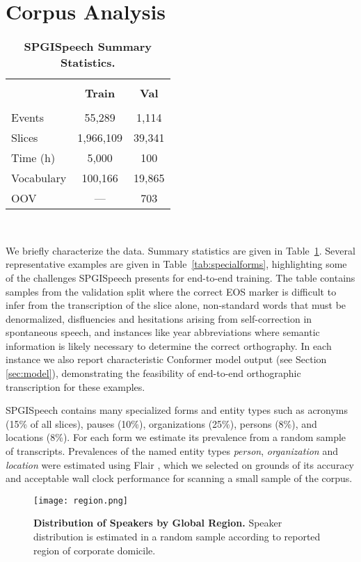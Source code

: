 \documentclass{article}
\newcommand{\traincalls}{55,289}
\newcommand{\valcalls}{1,114}
\newcommand{\trainslices}{1,966,109}
\newcommand{\valslices}{39,341}
\newcommand{\trainvocab}{100,166}
\newcommand{\valvocab}{19,865}
\newcommand\tabref{Table~\ref}
\newcommand{\corpus}{SPGISpeech}
\begin{document}
\section{Corpus Analysis}\label{sec:analysis}

\begin{table}\centering
\begin{tabular}{l|cc}
\hline
  \\ [-2.2ex]
  & \textbf{Train} & \textbf{Val}  \\
  \hline
  \hline
  \\ [-2.0ex]
  Events & \traincalls & \valcalls  \\
  Slices & \trainslices & \valslices \\
  Time (h) & 5,000 & 100\\
  Vocabulary & \trainvocab & \valvocab \\
  OOV & --- &  703\\
\hline
\end{tabular}
 \\ [0.5ex]
\caption{\textbf{\corpus{} Summary Statistics.}}
\label{tab:stats}
\end{table}


We briefly characterize the data.  Summary statistics are given in \tabref{tab:stats}.  Several representative
examples are given in \tabref{tab:specialforms}, highlighting some of the challenges \corpus{} presents for end-to-end training.  The table contains samples from the validation split where the correct EOS marker is difficult to infer from the transcription of the slice alone, non-standard words that must be denormalized, disfluencies and hesitations arising from self-correction in spontaneous speech, and instances like year abbreviations where semantic information is likely necessary to determine the correct orthography.  In each instance we also report characteristic Conformer model output (see Section \ref{sec:model}), demonstrating the feasibility of end-to-end orthographic transcription for these examples.  







\corpus{} contains many specialized forms and entity types such as acronyms (15\% of all slices), pauses (10\%), organizations (25\%), persons (8\%), and locations (8\%).  For each form we estimate its prevalence from a random sample of transcripts.
Prevalences of the named entity types \textit{person},
\textit{organization} and \textit{location} were estimated using Flair \cite{akbik18}, which we selected on grounds of its accuracy and acceptable wall clock performance for scanning a small sample of the corpus.  
\begin{figure}[h]
  \centering
  \texttt{[image: region.png]}
  \caption{\textbf{Distribution of Speakers by Global Region.}
    Speaker distribution is estimated in a random sample according to
    reported region of corporate domicile.}

  \label{fig:regions}
\end{figure}
\end{document}
